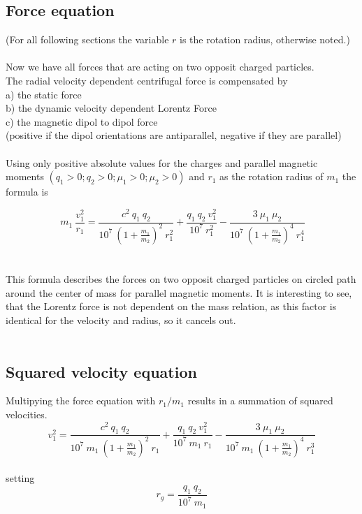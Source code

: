 \documentclass[10pt,titlepage]{article}
\begin{document}
\subsection{Force equation}
(For all following sections the variable $r$ is the rotation radius, otherwise noted.)
\\
\\
Now we have all forces that are acting on two opposit charged particles.
\\
The radial velocity dependent centrifugal force is compensated by \\
a) the static force \\
b) the dynamic velocity dependent Lorentz Force \\
c) the magnetic dipol to dipol force \\(positive if the dipol orientations are antiparallel, negative if they are parallel)
\\\\
Using only positive absolute values for the charges and parallel magnetic moments $(q_1>0 ; q_2>0 ; \mu_1>0 ; \mu_2>0)$ and $r_1$ as the rotation radius of $m_1$ the formula is

\begin{equation}
\ m_1 \ \frac{v_1^2}{r_1}=\frac{c^2 \ q_1 \ q_2}{10^7 \ (1+\frac{m_1}{m_2})^2 \ r_1^2}+\frac{q_1 \ q_2 \ v_1^2}{10^7 \ r_1^2}-\frac{3 \ \mu_1 \ \mu_2}{10^7 \ (1+\frac{m_1}{m_2})^4 \ r_1^4}
\end{equation}
\\
\\
This formula describes the forces on two opposit charged particles on circled path around the center of mass for parallel magnetic moments. It is interesting to see, that the Lorentz force is not dependent on the mass relation, as this factor is identical for the velocity and radius, so it cancels out.
\\\\



\subsection{Squared velocity equation}
Multipying the force equation with $r_1/m_1$ results in a summation of squared velocities.
\begin{equation}
\label{velocity_equation}
 v_1^2=\frac{c^2 \ q_1 \ q_2}{10^7 \ m_1 \ (1+\frac{m_1}{m_2})^2 \ r_1}+\frac{q_1 \ q_2 \ v_1^2}{10^7 \ m_1 \ r_1}-\frac{3 \ \mu_1 \ \mu_2}{10^7 \ m_1 \ (1+\frac{m_1}{m_2})^4 \ r_1^3}
\end{equation}
\\
setting  $$r_g=\frac{q_1 \ q_2}{10^7 \ m_1}$$
\end{document}
